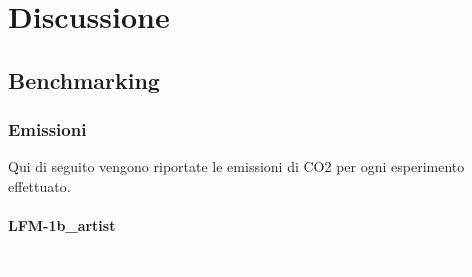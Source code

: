 \section{Discussione}

\subsection{Benchmarking}

\subsubsection{Emissioni}
Qui di seguito vengono riportate le emissioni di CO2 per ogni esperimento effettuato.

\paragraph{LFM-1b\_artist} \textcolor{white}{.} \\
